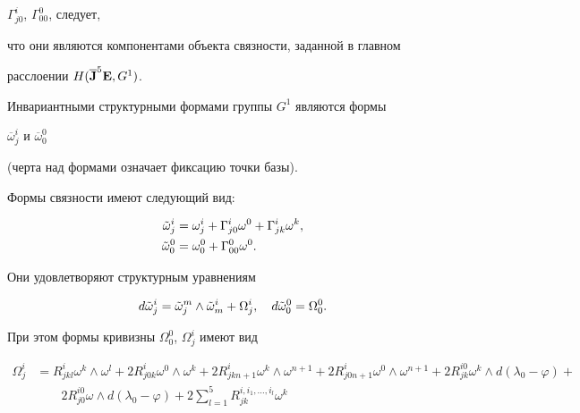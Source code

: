 \begin{notes}
$\Gamma^i_{j0}$, $\Gamma^0_{00}$, следует, 


что они являются компонентами объекта связности, заданной в главном 


расслоении $H(\overline{\bold J}^5\bold E,G^1)$. 


 


Инвариантными структурными формами группы $G^1$ являются формы 


$\overline\omega^i_j$ и $\overline\omega^0_0$ 


(черта над формами означает фиксацию точки базы). 


Формы связности имеют следующий вид: 


\begin{equation} 


\begin{split} 


\Tilde\omega^i_j&=\omega^i_j+\Gamma^i_{j0}\omega^0+ 


\Gamma^i_{jk}\omega^k,\\ 


\Tilde\omega^0_0&=\omega^0_0+\Gamma^0_{00}\omega^0. 


\end{split} 


\end{equation} 


Они удовлетворяют структурным уравнениям 


$$


d\Tilde\omega^i_j=\Tilde\omega^m_j\wedge\Tilde\omega^i_m+ 


\Omega^i_j,\quad d\Tilde\omega^0_0=\Omega^0_0. 


$$


При этом формы кривизны $\Omega^0_0$, $\Omega^i_j$ имеют вид


\begin{align*} 


\Omega^i_j&=R^i_{jkl}\omega^k\wedge\omega^l+2R^i_{j0k} 


\omega^0\wedge\omega^k+2R^i_{jkn+1}\omega^k 


\wedge\omega^{n+1}+2R^i_{j0n+1}\omega^0\wedge\omega^{n+1} 


+2R^{i0}_{jk}\omega^k\wedge d(\lambda_0-\varphi)+\\ 


&\qquad 2R^{i0}_{j0}\omega\wedge d(\lambda_0-\varphi)+ 


2\sum^5_{l=1}R^{i,i_1,\dotsc,i_l}_{jk}\omega^k 



\end{align*}
\end{notes}
